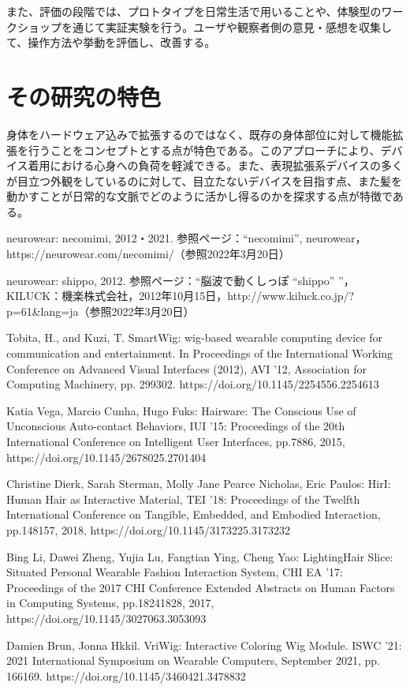 \documentclass[a4paper]{jsarticle}
\begin{document}
また、評価の段階では、プロトタイプを日常生活で用いることや、体験型のワークショップを通じて実証実験を行う。ユーザや観察者側の意見・感想を収集して、操作方法や挙動を評価し、改善する。

\section{その研究の特色}
身体をハードウェア込みで拡張するのではなく、既存の身体部位に対して機能拡張を行うことをコンセプトとする点が特色である。このアプローチにより、デバイス着用における心身への負荷を軽減できる。また、表現拡張系デバイスの多くが目立つ外観をしているのに対して、目立たないデバイスを目指す点、また髪を動かすことが日常的な文脈でどのように活かし得るのかを探求する点が特徴である。


\begin{thebibliography}{999}

 neurowear: necomimi, 2012・2021. 参照ページ：“necomimi”, neurowear，https://neurowear.com/necomimi/（参照2022年3月20日）

neurowear: shippo, 2012. 参照ページ：“脳波で動くしっぽ “shippo” ”，KILUCK：機楽株式会社，2012年10月15日，http://www.kiluck.co.jp/?p=61\&lang=ja（参照2022年3月20日）
  
Tobita, H., and Kuzi, T. SmartWig: wig-based wearable computing device for communication and entertainment. In Proceedings of the International Working Conference on Advanced Visual Interfaces (2012), AVI ’12, Association for Computing Machinery, pp. 299302. https://doi.org/10.1145/2254556.2254613

Katia Vega, Marcio Cunha, Hugo Fuks: Hairware: The Conscious Use of Unconscious Auto-contact Behaviors, IUI '15: Proceedings of the 20th International Conference on Intelligent User Interfaces, pp.7886, 2015, https://doi.org/10.1145/2678025.2701404

Christine Dierk, Sarah Sterman, Molly Jane Pearce Nicholas, Eric Paulos: HirI: Human Hair as Interactive Material, TEI '18: Proceedings of the Twelfth International Conference on Tangible, Embedded, and Embodied Interaction, pp.148157, 2018, https://doi.org/10.1145/3173225.3173232

Bing Li, Dawei Zheng, Yujia Lu, Fangtian Ying, Cheng Yao: LightingHair Slice: Situated Personal Wearable Fashion Interaction System, CHI EA '17: Proceedings of the 2017 CHI Conference Extended Abstracts on Human Factors in Computing Systems, pp.18241828, 2017, https://doi.org/10.1145/3027063.3053093

Damien Brun,  Jonna Hkkil. VriWig: Interactive Coloring Wig Module. ISWC '21: 2021 International Symposium on Wearable Computers, September 2021,  pp. 166169. https://doi.org/10.1145/3460421.3478832

\end{thebibliography}
\end{document}
